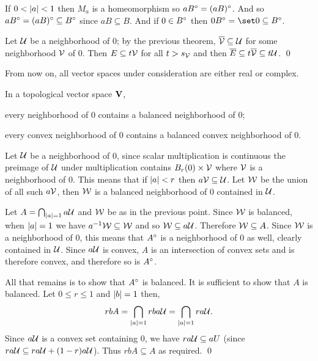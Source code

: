 \bproof

    \benum
        \item If $0<\mathopen{}\mathclose{\left|a\right|}<1$ then $M_a$ is a homeomorphism so $aB^{\circ}=(aB)^{\circ}$.
        And so $aB^{\circ}=(aB)^{\circ}\subseteq B^{\circ}$ since $aB\subseteq B$.
        And if $0\in B^{\circ}$ then $0\interior B=\set0\subseteq\interior B$.
        \item Let ${\cal U}$ be a neighborhood of $0$; by the previous theorem, $\overline{{\cal V}}\subseteq{\cal U}$ for some neighborhood ${\cal V}$ of $0$.
        Then $E\subseteq t{\cal V}$ for all $t>s_{{\cal V}}$ and then $\overline E\subseteq t\overline{{\cal V}}\subseteq t{\cal U}$.
        \qed
    \eenum

\eproof

\bnote

    From now on, all vector spaces under consideration are either real or complex.

\enote

\bthrm

    In a topological vector space ${\bf V}$,
    \benum
        \item every neighborhood of $0$ contains a balanced neighborhood of $0$;
        \item every convex neighborhood of $0$ contains a balanced convex neighborhood of $0$.
    \eenum

\ethrm

\bproof

    \benum
        \item Let ${\cal U}$ be a neighborhood of $0$, since scalar multiplication is continuous the preimage of ${\cal U}$ under multiplication contains $B_r(0)\times{\cal V}$ where ${\cal V}$ is a neighborhood of $0$.
        This means that if $\mathopen{}\mathclose{\left|a\right|}<r$ then $a{\cal V}\subseteq{\cal U}$.
        Let ${\cal W}$ be the union of all such $a{\cal V}$, then ${\cal W}$ is a balanced neighborhood of $0$ contained in ${\cal U}$.
        \item Let $A=\bigcap_{\mathopen{}\mathclose{\left|a\right|}=1}a{\cal U}$ and ${\cal W}$ be as in the previous point.
        Since ${\cal W}$ is balanced, when $\mathopen{}\mathclose{\left|a\right|}=1$ we have $a^{-1}{\cal W}\subseteq{\cal W}$ and so ${\cal W}\subseteq a{\cal U}$.
        Therefore ${\cal W}\subseteq A$.
        Since ${\cal W}$ is a neighborhood of $0$, this means that $A^{\circ}$ is a neighborhood of $0$ as well, clearly contained in ${\cal U}$.
        Since $a{\cal U}$ is convex, $A$ is an intersection of convex sets and is therefore convex, and therefore so is $A^{\circ}$.

        All that remains is to show that $A^{\circ}$ is balanced.
        It is sufficient to show that $A$ is balanced.
        Let $0\leq r\leq 1$ and $\mathopen{}\mathclose{\left|b\right|}=1$ then,
        $$ rb A = \bigcap_{\mathopen{}\mathclose{\left|a\right|}=1}rba{\cal U} = \bigcap_{\mathopen{}\mathclose{\left|a\right|}=1}ra{\cal U} . $$
        Since $a{\cal U}$ is a convex set containing $0$, we have $ra{\cal U}\subseteq aU$ (since $ra{\cal U}\subseteq ra{\cal U}+(1-r)a{\cal U}$).
        Thus $rb A\subseteq A$ as required.
        \qed
    \eenum

